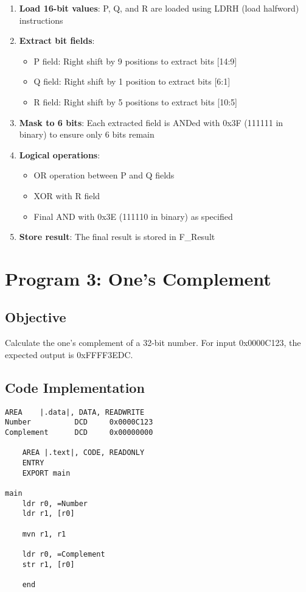 \documentclass[12pt,a4paper]{article}
\begin{document}
\begin{enumerate}
    \item \textbf{Load 16-bit values}: P, Q, and R are loaded using LDRH (load halfword) instructions
    \item \textbf{Extract bit fields}:
        \begin{itemize}
            \item P field: Right shift by 9 positions to extract bits [14:9]
            \item Q field: Right shift by 1 position to extract bits [6:1]
            \item R field: Right shift by 5 positions to extract bits [10:5]
        \end{itemize}
    \item \textbf{Mask to 6 bits}: Each extracted field is ANDed with 0x3F (111111 in binary) to ensure only 6 bits remain
    \item \textbf{Logical operations}:
        \begin{itemize}
            \item OR operation between P and Q fields
            \item XOR with R field
            \item Final AND with 0x3E (111110 in binary) as specified
        \end{itemize}
    \item \textbf{Store result}: The final result is stored in F\_Result
\end{enumerate}

\newpage
\section{Program 3: One's Complement}

\subsection{Objective}
Calculate the one's complement of a 32-bit number. For input 0x0000C123, the expected output is 0xFFFF3EDC.

\subsection{Code Implementation}

\begin{lstlisting}[style=assembly, caption=One's Complement Implementation]
    AREA    |.data|, DATA, READWRITE
Number          DCD     0x0000C123
Complement      DCD     0x00000000

    AREA |.text|, CODE, READONLY
    ENTRY
    EXPORT main

main
    ldr r0, =Number
    ldr r1, [r0]

    mvn r1, r1

    ldr r0, =Complement
    str r1, [r0]

    end
\end{lstlisting}
\end{document}
